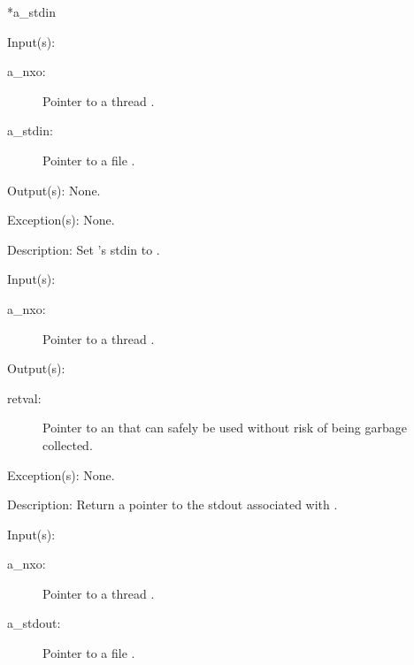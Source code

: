 \begin{capi}
{{ *a\_stdin}}
	\begin{capilist}
	\item[Input(s): ]
		\begin{description}\item[]
		\item[a\_nxo: ]
			Pointer to a thread .
		\item[a\_stdin: ]
			Pointer to a file .
		\end{description}
	\item[Output(s): ] None.
	\item[Exception(s): ] None.
	\item[Description: ]
		Set 's stdin to .
	\end{capilist}
\label{nxo_thread_stdout_get}
	\begin{capilist}
	\item[Input(s): ]
		\begin{description}\item[]
		\item[a\_nxo: ]
			Pointer to a thread \classname{nxo}.
		\end{description}
	\item[Output(s): ]
		\begin{description}\item[]
		\item[retval: ]
			Pointer to an  that can safely be used
			without risk of being garbage collected.
		\end{description}
	\item[Exception(s): ] None.
	\item[Description: ]
		Return a pointer to the stdout associated with \cvar{a\_nxo}.
	\end{capilist}
\label{nxo_thread_stdout_set}
	\begin{capilist}
	\item[Input(s): ]
		\begin{description}\item[]
		\item[a\_nxo: ]
			Pointer to a thread .
		\item[a\_stdout: ]
			Pointer to a file \classname{nxo}.
		\end{description}

\end{capilist}
\end{capi}
